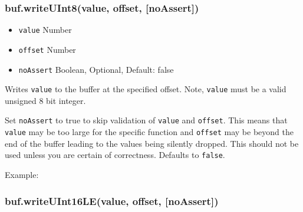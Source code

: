 \subsubsection{buf.writeUInt8(value, offset,
{[}noAssert{]})}\label{buf.writeuint8value-offset-noassert}

\begin{itemize}
\itemsep1pt\parskip0pt
\item
  \texttt{value} Number
\item
  \texttt{offset} Number
\item
  \texttt{noAssert} Boolean, Optional, Default: false
\end{itemize}

Writes \texttt{value} to the buffer at the specified offset. Note,
\texttt{value} must be a valid unsigned 8 bit integer.

Set \texttt{noAssert} to true to skip validation of \texttt{value} and
\texttt{offset}. This means that \texttt{value} may be too large for the
specific function and \texttt{offset} may be beyond the end of the
buffer leading to the values being silently dropped. This should not be
used unless you are certain of correctness. Defaults to \texttt{false}.

Example:

\begin{Shaded}
\begin{Highlighting}[]
  \NormalTok{(}\NormalTok{);}
\NormalTok{(}\NormalTok{, }\NormalTok{);}
\NormalTok{(}\NormalTok{, }\NormalTok{);}
\NormalTok{(}\NormalTok{, }\NormalTok{);}
\NormalTok{(}\NormalTok{, }\NormalTok{);}


\end{Highlighting}
\end{Shaded}

\subsubsection{buf.writeUInt16LE(value, offset,
{[}noAssert{]})}\label{buf.writeuint16levalue-offset-noassert}

